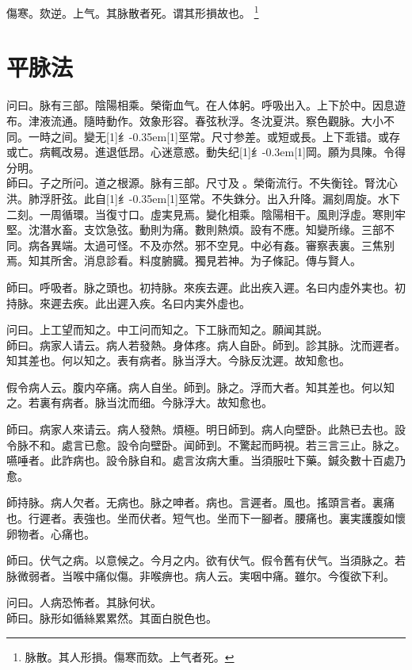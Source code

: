 \documentclass[11pt,oneside,b5paper]{ctexbook}
\begin{document}
\begin{flushleft}
傷寒。欬逆。上气。其脉散者死。谓其形損故也。
\footnote{脉散。其人形損。傷寒而欬。上气者死。}

\chapter{平脉法}

问曰。脉有三部。陰陽相乘。榮衛血气。在人体躬。呼吸出入。上下於中。因息遊布。津液流通。隨時動作。效象形容。春弦秋浮。冬沈夏洪。察色觀脉。大小不同。一時之间。變无{\hbox{\scalebox{0.68}[1]{纟}\kern-0.35em\scalebox{0.64}[1]{巠}}}常。尺寸参差。或短或長。上下乖错。或存或亡。病輒改易。進退低昂。心迷意惑。動失纪{\hbox{\scalebox{0.6}[1]{纟}\kern-0.3em\scalebox{0.63}[1]{岡}}}。願为具陳。令得分明。\\
師曰。子之所问。道之根源。脉有三部。尺寸及{𬮦}。榮衛流行。不失衡铨。腎沈心洪。肺浮肝弦。此自{\hbox{\scalebox{0.68}[1]{纟}\kern-0.35em\scalebox{0.64}[1]{巠}}}常。不失銖分。出入升降。漏刻周旋。水下二刻。一周循環。当復寸口。虛実見焉。變化相乘。陰陽相干。風則浮虛。寒則牢堅。沈潛水畜。支饮急弦。動則为痛。數則熱煩。設有不應。知變所缘。三部不同。病各異端。太過可怪。不及亦然。邪不空見。中必有姦。審察表裏。三焦别焉。知其所舍。消息診看。料度腑臓。獨見若神。为子條記。傳与賢人。

師曰。呼吸者。脉之頭也。初持脉。來疾去遲。此出疾入遲。名曰内虛外実也。初持脉。來遲去疾。此出遲入疾。名曰内実外虛也。

问曰。上工望而知之。中工问而知之。下工脉而知之。願闻其説。\\
師曰。病家人请云。病人若發熱。身体疼。病人自卧。師到。診其脉。沈而遲者。知其差也。何以知之。表有病者。脉当浮大。今脉反沈遲。故知愈也。

假令病人云。腹内卒痛。病人自坐。師到。脉之。浮而大者。知其差也。何以知之。若裏有病者。脉当沈而细。今脉浮大。故知愈也。

師曰。病家人來请云。病人發熱。煩極。明日師到。病人向壁卧。此熱已去也。設令脉不和。處言已愈。設令向壁卧。闻師到。不驚起而眄視。若三言三止。脉之。嚥唾者。此詐病也。設令脉自和。處言汝病大重。当須服吐下藥。鍼灸數十百處乃愈。

師持脉。病人欠者。无病也。脉之呻者。病也。言遲者。風也。搖頭言者。裏痛也。行遲者。表強也。坐而伏者。短气也。坐而下一腳者。腰痛也。裏実護腹如懷卵物者。心痛也。

師曰。伏气之病。以意候之。今月之内。欲有伏气。假令舊有伏气。当須脉之。若脉微弱者。当喉中痛似傷。非喉痹也。病人云。実咽中痛。雖尔。今復欲下利。

问曰。人病恐怖者。其脉何状。\\
師曰。脉形如循絲累累然。其面白脱色也。


\end{flushleft}
\end{document}
